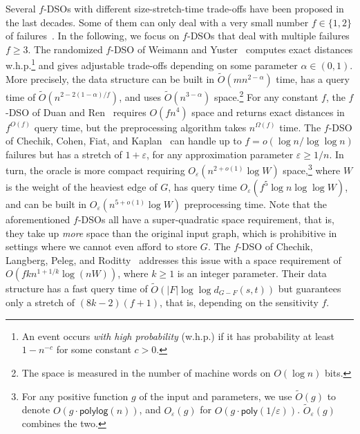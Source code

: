 \documentclass{article}\usepackage[a4paper,margin=20mm]{geometry}
\newcommand*{\Otilde}{\widetilde{O}}
\newcommand*{\poly}{\textsf{poly}}
\newcommand*{\polylog}{\textsf{polylog}}
\renewcommand{\geq}{\geqslant}
\renewcommand{\ge}{\geqslant}
\newcommand{\eps}{\varepsilon}
\begin{document}
Several $f$-DSOs with different size-stretch-time trade-offs have been proposed in the last decades.
Some of them can only deal with a very small number $f \in \{1,2\}$ of failures~\cite{BaswanaK13, BeKa08, BeKa09, BCFS21SingleSourceDSO_ESA, ChCo20, DemetrescuT02, DeThChRa08, DuanP09a, GrandoniVWilliamsFasterRPandDSO_journal, GuRen21, Ren22Improved}. In the following, we focus on $f$-DSOs that deal with multiple failures $f \geq 3$. The randomized $f$-DSO of Weimann and Yuster~\cite{WY13} computes exact distances w.h.p.\footnote{%
  An event occurs \emph{with high probability} (w.h.p.) if it has probability at least $1- n^{-c}$ for some constant $c >0$.
}
and gives adjustable trade-offs depending on some parameter $\alpha \in (0,1)$.
More precisely, the data structure can be built in $\Otilde(mn^{2-\alpha})$ time, has a query time of 
$\Otilde(n^{2-2(1-\alpha)/f})$, and uses $\Otilde(n^{3-\alpha})$ space.\footnote{%
  The space is measured in the number of machine words on $O(\log n)$ bits.
} 
For any constant $f$, the $f$-DSO of Duan and Ren~\cite{DuRe22} requires $O(fn^4)$ space and
returns exact distances in $f^{O(f)}$ query time, but the preprocessing algorithm 
takes $n^{\Omega(f)}$ time. The $f$-DSO of Chechik, Cohen, Fiat, and Kaplan~\cite{ChCoFiKa17}
can handle up to $f = o(\log n / \log \log n)$ failures
but has a stretch of $1+\eps$, for any approximation parameter $\eps \ge 1/n$.
In turn, the oracle is more compact requiring $O_{\varepsilon}(n^{2+o(1)}\log W)$ space,\footnote{%
	For any positive function $g$ of the input and parameters, we use 
	$\Otilde(g)$ to denote $O(g \cdot \polylog(n))$,
	and $O_{\varepsilon}(g)$ for $O(g \cdot \poly(1/\varepsilon))$.
	$\Otilde_{\varepsilon}(g)$ combines the two.
}
where $W$ is the weight of the heaviest edge of $G$,
has query time $O_{\varepsilon}(f^5\log n \log \log W)$,
and can be built in $O_{\varepsilon}(n^{5+o(1)}\log W)$ preprocessing time.
Note that the aforementioned $f$-DSOs all have a super-quadratic space requirement,
that is, they take up \emph{more} space than the original input graph,
which is prohibitive in settings where we cannot even afford to store $G$.
The $f$-DSO of Chechik, Langberg, Peleg, and Roditty~\cite{CLPR12} addresses this issue
with a space requirement of $O(fkn^{1+1/k}\log(nW))$, 
where $k\geq 1$ is an integer parameter.
Their data structure has a fast query time of $\Otilde(|F| \log\log d_{G-F}(s,t))$
but guarantees only a stretch of $(8k-2)(f+1)$,
that is, depending on the sensitivity $f$.
\end{document}
